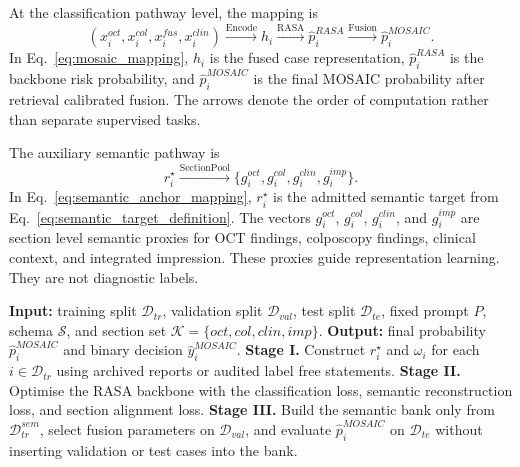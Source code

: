 At the classification pathway level, the mapping is
\begin{equation}
(x_i^{oct},x_i^{col},x_i^{fus},x_i^{clin})
\xrightarrow{\mathrm{Encode}}
h_i
\xrightarrow{\mathrm{RASA}}
\hat{p}_i^{RASA}
\xrightarrow{\mathrm{Fusion}}
\hat{p}_i^{MOSAIC}.
\label{eq:mosaic_mapping}
\end{equation}
In Eq.~\eqref{eq:mosaic_mapping}, $h_i$ is the fused case representation, $\hat{p}_i^{RASA}$ is the backbone risk probability, and $\hat{p}_i^{MOSAIC}$ is the final MOSAIC probability after retrieval calibrated fusion. The arrows denote the order of computation rather than separate supervised tasks.

The auxiliary semantic pathway is
\begin{equation}
r_i^{\star}
\xrightarrow{\mathrm{SectionPool}}
\{g_i^{oct},g_i^{col},g_i^{clin},g_i^{imp}\}.
\label{eq:semantic_anchor_mapping}
\end{equation}
In Eq.~\eqref{eq:semantic_anchor_mapping}, $r_i^{\star}$ is the admitted semantic target from Eq.~\eqref{eq:semantic_target_definition}. The vectors $g_i^{oct}$, $g_i^{col}$, $g_i^{clin}$, and $g_i^{imp}$ are section level semantic proxies for OCT findings, colposcopy findings, clinical context, and integrated impression. These proxies guide representation learning. They are not diagnostic labels.

\begin{algorithm}[!t]
\scriptsize
\caption{MOSAIC training and inference protocol}
\label{alg:mosaic_protocol}
\begin{algorithmic}[1]
\State \textbf{Input:} training split $\mathcal{D}_{tr}$, validation split $\mathcal{D}_{val}$, test split $\mathcal{D}_{te}$, fixed prompt $P$, schema $\mathcal{S}$, and section set $\mathcal{K}=\{oct,col,clin,imp\}$.
\State \textbf{Output:} final probability $\hat{p}_i^{MOSAIC}$ and binary decision $\hat{y}_i^{MOSAIC}$.
\Statex
\State \textbf{Stage I.} Construct $r_i^{\star}$ and $\omega_i$ for each $i\in\mathcal{D}_{tr}$ using archived reports or audited label free statements.
\State \textbf{Stage II.} Optimise the RASA backbone with the classification loss, semantic reconstruction loss, and section alignment loss.
\State \textbf{Stage III.} Build the semantic bank only from $\mathcal{D}_{tr}^{sem}$, select fusion parameters on $\mathcal{D}_{val}$, and evaluate $\hat{p}_i^{MOSAIC}$ on $\mathcal{D}_{te}$ without inserting validation or test cases into the bank.
\end{algorithmic}
\end{algorithm}

